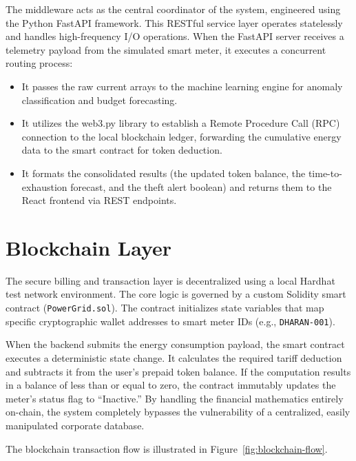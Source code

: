 The middleware acts as the central coordinator of the system, engineered using the Python FastAPI framework. This RESTful service layer operates statelessly and handles high-frequency I/O operations. When the FastAPI server receives a telemetry payload from the simulated smart meter, it executes a concurrent routing process:

\begin{itemize}

\item It passes the raw current arrays to the machine learning engine for anomaly classification and budget forecasting.

\item It utilizes the web3.py library to establish a Remote Procedure Call (RPC) connection to the local blockchain ledger, forwarding the cumulative energy data to the smart contract for token deduction.

\item It formats the consolidated results (the updated token balance, the time-to-exhaustion forecast, and the theft alert boolean) and returns them to the React frontend via REST endpoints.

\end{itemize}


\section{Blockchain Layer}

The secure billing and transaction layer is decentralized using a local Hardhat test network environment. The core logic is governed by a custom Solidity smart contract (\texttt{PowerGrid.sol}). The contract initializes state variables that map specific cryptographic wallet addresses to smart meter IDs (e.g., \texttt{DHARAN-001}).

When the backend submits the energy consumption payload, the smart contract executes a deterministic state change. It calculates the required tariff deduction and subtracts it from the user's prepaid token balance. If the computation results in a balance of less than or equal to zero, the contract immutably updates the meter's status flag to ``Inactive.'' By handling the financial mathematics entirely on-chain, the system completely bypasses the vulnerability of a centralized, easily manipulated corporate database.

The blockchain transaction flow is illustrated in Figure~\ref{fig:blockchain-flow}.

